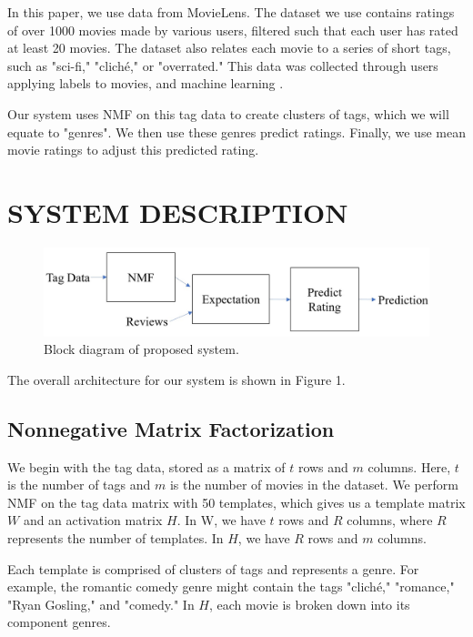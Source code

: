 \documentclass[letterpaper, 10 pt, conference]{ieeeconf}  %
\begin{document}
In this paper, we use data from MovieLens. The dataset we use contains ratings of over 1000 movies made by various users, filtered such that each user has rated at least 20 movies.
The dataset also relates each movie to a series of short tags, such as "sci-fi," "cliché," or "overrated." This data was collected through users applying labels to movies, and machine learning \cite{lenskitdata}.


Our system uses NMF on this tag data to create clusters of tags, which we will equate to "genres". We then use these genres predict ratings. Finally, we use mean movie ratings to adjust this predicted rating.


\section{SYSTEM DESCRIPTION}

\begin{figure}[h]
   \includegraphics[scale=0.5]{./figs/blockdiagram.jpg}
   \caption{Block diagram of proposed system.}
\end{figure}

The overall architecture for our system is shown in Figure 1.

\subsection{Nonnegative Matrix Factorization}

We begin with the tag data, stored as a matrix of $t$ rows and $m$ columns. Here, $t$ is the number of tags and $m$ is the number of movies in the dataset.
We perform NMF on the tag data matrix with 50 templates, which gives us a template matrix $W$ and an activation matrix $H$.
In W, we have $t$ rows and $R$ columns, where $R$ represents the number of templates. In $H$, we have $R$ rows and $m$ columns. 

Each template is comprised of clusters of tags and represents a genre. For example, the romantic comedy genre might contain the tags "cliché," "romance," "Ryan Gosling," and "comedy." In $H$, each movie is broken down into its component genres.
\end{document}

